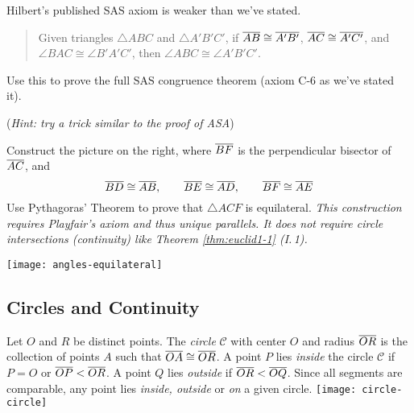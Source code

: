\begin{exercises}
\begin{enumerate}
	  
	  \item\label{exs:hilbertsas} Hilbert's published SAS axiom is weaker than we've stated.
		\begin{quote}
			Given triangles $\triangle ABC$ and $\triangle A'B'C'$, if $\overline{AB}\cong\overline{A'B'}$, $\overline{AC}\cong\overline{A'C'}$, and $\angle BAC\cong\angle B'A'C'$, then $\angle ABC\cong\angle A'B'C'$. 
		\end{quote}
		Use this to prove the full SAS congruence theorem (axiom C-6 as we've stated it).\par
		(\emph{Hint: try a trick similar to the proof of ASA})
		
		
		\begin{minipage}[t]{0.7\linewidth}\vspace{0pt}
		  \item\label{ex:pythagnocont} Construct the picture on the right, where $\overline{BF}$ is the perpendicular bisector of $\overline{AC}$, and
		  \[
		  	\overline{BD}\cong\overline{AB},\qquad \overline{BE}\cong\overline{AD},\qquad \overline{BF}\cong\overline{AE}
		  \]
		  Use Pythagoras' Theorem to prove that $\triangle ACF$ is equilateral.\smallbreak
		  \emph{This construction requires Playfair's axiom and thus unique parallels. It does not require circle intersections (continuity) like Theorem \ref{thm:euclid1-1} (I.\,1).}
	  \end{minipage}
	  \hfill
	  \begin{minipage}[t]{0.29\linewidth}\vspace{-5pt}
	  	\flushright
	  	\texttt{[image: angles-equilateral]}
	  \end{minipage}
	  \smallbreak
	\end{enumerate}
\end{exercises}


\clearpage

\subsection{Circles and Continuity}\label{sec:circ}

\begin{defn}[lower separated=false, sidebyside, sidebyside align=top seam, sidebyside gap=0pt, righthand width=0.22\linewidth]{}{}
Let $O$ and $R$ be distinct points. The \emph{circle} $\mathcal C$ with center $O$ and radius $\overline{OR}$ is the collection of points $A$ such that $\overline{OA}\cong\overline{OR}$.\smallbreak
A point $P$ lies \emph{inside} the circle $\mathcal C$ if $P=O$ or $\overline{OP}<\overline{OR}$.\smallbreak
A point $Q$ lies \emph{outside} if $\overline{OR}<\overline{OQ}$.\smallbreak
Since all segments are comparable, any point lies \emph{inside, outside} or \emph{on} a given circle.
\tcblower
\flushright\texttt{[image: circle-circle]}
\end{defn}

